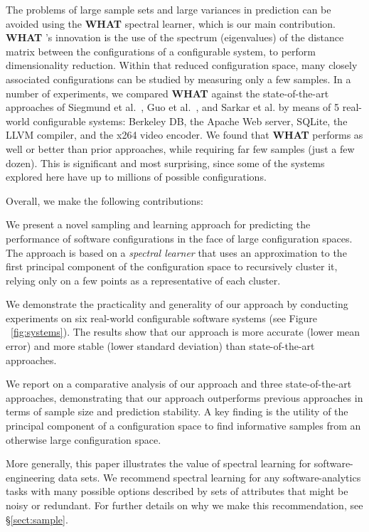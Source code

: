 \documentclass{sig-alternative}
\newcommand{\tion}[1]{\S\ref{sect:#1}}
\newcommand{\what}{{\bf WHAT }}
\begin{document}
The problems of large sample sets and large variances in prediction can be avoided using the \what spectral learner, which is our main contribution.  
{\what}'s innovation is  the use of the spectrum (eigenvalues) of the distance matrix
between the configurations of a configurable system, to perform dimensionality reduction. Within that
reduced configuration space, many closely associated configurations can be studied
by measuring only a few samples.
In a number of experiments, we compared \what against the state-of-the-art approaches of Siegmund et al.~\cite{siegmund2012predicting}, Guo et al.~\cite{guo2013variability}, and Sarkar et al. \cite{sarkar2015cost} by means of 5 real-world configurable systems: Berkeley DB,  the Apache Web server, SQLite, the LLVM compiler, and the x264 video encoder.
We found that \what performs as well or better than prior approaches,
while  requiring far few samples (just a few dozen).
This is significant and most surprising, since some of the systems explored here have up to millions of possible configurations. 

Overall, we make the following contributions:
\begin{compactitem}
\item We present a novel sampling and learning approach for predicting the performance of software configurations in the face of large configuration spaces. The approach is based on a
{\em spectral
learner} that uses an approximation to the first principal component of the configuration space to recursively cluster it, relying only on a few points as a representative of each cluster.
\item We demonstrate the practicality and generality of our approach by conducting experiments on six real-world configurable software systems (see Figure ~\ref{fig:systems}). The results show that our approach is more accurate (lower mean error) and more stable (lower standard deviation) than state-of-the-art approaches.
\item We report on a comparative analysis of our approach and three state-of-the-art approaches, demonstrating that our approach outperforms previous approaches in terms of sample size and prediction stability. A key finding is the utility of the principal component of a configuration space to  find informative samples from an otherwise large configuration space.
\end{compactitem}
More generally, this paper illustrates the value of spectral learning for software-engineering data sets. We recommend spectral learning for any software-analytics
tasks with many possible options described by sets of attributes
that might be noisy or redundant. For further details on why we make this recommendation, see \tion{sample}.
\end{document}
